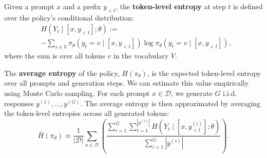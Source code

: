 Given a prompt $x$ and a prefix $y_{<t}$, the \textbf{token-level entropy} at step $t$ is defined over the policy's conditional distribution:
\begin{align*}
&H(Y_t \mid [x, y_{<t}]; \theta) := \\
&-\sum_{v \in V} \pi_\theta(y_t = v \mid [x, y_{<t}]) \log \pi_\theta(y_t = v \mid [x, y_{<t}]),
\end{align*}
where the sum is over all tokens $v$ in the vocabulary $V$.

The \textbf{average entropy} of the policy, $H(\pi_\theta)$, is the expected token-level entropy over all prompts and generation steps. We can estimate this value empirically using Monte Carlo sampling. For each prompt $x \in \mathcal{D}$, we generate $G$ i.i.d. responses $y^{(1)}, \dots, y^{(G)}$. The average entropy is then approximated by averaging the token-level entropies across all generated tokens:
$$
\bar{H}(\pi_\theta) \approx \frac{1}{|\mathcal{D}|} \sum_{x \in \mathcal{D}} \left( \frac{\sum_{i=1}^G \sum_{t=1}^{|y^{(i)}|} H(Y_t \mid [x, y^{(i)}_{<t}]; \theta)}{\sum_{i=1}^G |y^{(i)}|} \right).
$$
